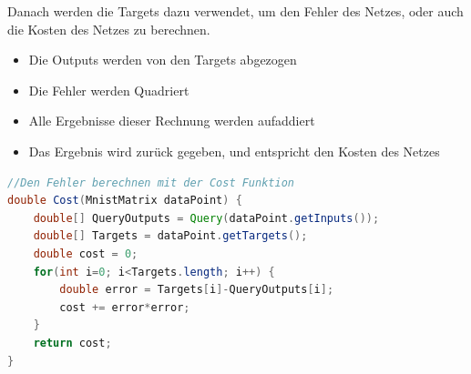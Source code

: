 \documentclass[12pt]{article}
\begin{document}
Danach werden die Targets dazu verwendet, um den Fehler des Netzes, oder auch die Kosten des Netzes zu berechnen. 
\begin{itemize}
\item Die Outputs werden von den Targets abgezogen
\item Die Fehler werden Quadriert
\item Alle Ergebnisse dieser Rechnung werden aufaddiert
\item Das Ergebnis wird zurück gegeben, und entspricht den Kosten des Netzes
\end{itemize}
\begin{lstlisting}[language=Java]
//Den Fehler berechnen mit der Cost Funktion
double Cost(MnistMatrix dataPoint) {
    double[] QueryOutputs = Query(dataPoint.getInputs());
    double[] Targets = dataPoint.getTargets();
    double cost = 0;
    for(int i=0; i<Targets.length; i++) {
        double error = Targets[i]-QueryOutputs[i];
        cost += error*error;
    }
    return cost;
}
\end{lstlisting}
\end{document}
